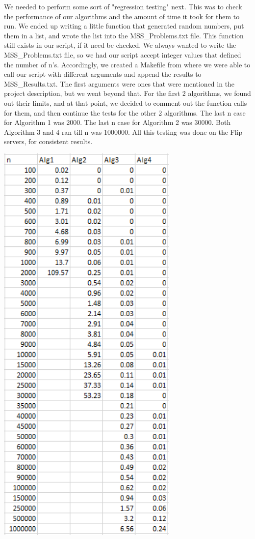 \documentclass[11pt,letterpaper]{article}
\begin{document}
\hspace{25pt}We needed to perform some sort of "regression testing" next. This was to check the performance of our algorithms and the amount of time it took for them to run. We ended up writing a little function that generated random numbers, put them in a list, and wrote the list into the MSS\_Problems.txt file. This function still exists in our script, if it need be checked. We always wanted to write the MSS\_Problems.txt file, so we had our script accept integer values that defined the number of n's. Accordingly, we created a Makefile from where we were able to call our script with different arguments and append the results to MSS\_Results.txt. The first arguments were ones that were mentioned in the project description, but we went beyond that. For the first 2 algorithms, we found out their limits, and at that point, we decided to comment out the function calls for them, and then continue the tests for the other 2 algorithms. The last n case for Algorithm 1 was 2000. The last n case for Algorithm 2 was 30000. Both Algorithm 3 and 4 ran till n was 1000000. All this testing was done on the Flip servers, for consistent results.\\
\centerline{\includegraphics[width=3.5in]{TestTimes.png}}
\pagebreak
\end{document}
